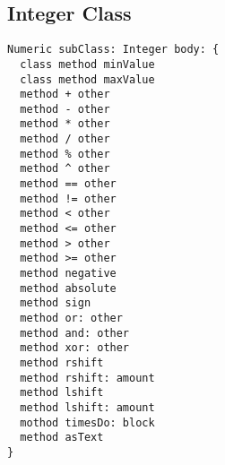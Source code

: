 \subsection{Integer Class}

\begin{lstlisting}
Numeric subClass: Integer body: {
  class method minValue
  class method maxValue
  method + other
  method - other
  method * other
  method / other
  method % other
  method ^ other
  method == other
  method != other
  method < other
  method <= other
  method > other
  method >= other
  method negative
  method absolute
  method sign
  method or: other
  method and: other
  method xor: other
  method rshift
  method rshift: amount
  method lshift
  method lshift: amount
  mothod timesDo: block
  method asText
}
\end{lstlisting}
